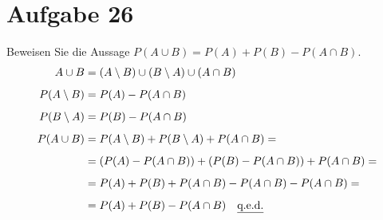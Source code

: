 \section{Aufgabe 26}
\setcounter{section}{26}

Beweisen Sie die Aussage $P(A \cup B) = P(A) + P(B) - P(A \cap B)$.
\begin{equation*}
    \begin{aligned}
        A \cup B &= (A \setminus B) \cup (B \setminus A) \cup (A \cap B) \\[5pt]
        P(A \setminus B) &= P(A) - P(A \cap B) \\[5pt]
        P(B \setminus A) &= P(B) - P(A \cap B) \\[5pt]
        P(A \cup B) &= P(A \setminus B) + P(B \setminus A) + P(A \cap B) = \\[5pt]
                    &= (P(A) - P(A \cap B)) + (P(B) - P(A \cap B)) + P(A \cap B) = \\[5pt]
                    &= P(A) + P(B) + P(A \cap B) - P(A \cap B) - P(A \cap B) = \\[5pt]
                    &= P(A) + P(B) - P(A \cap B) \quad \text{\underline{q.e.d.}}
    \end{aligned}
\end{equation*}

